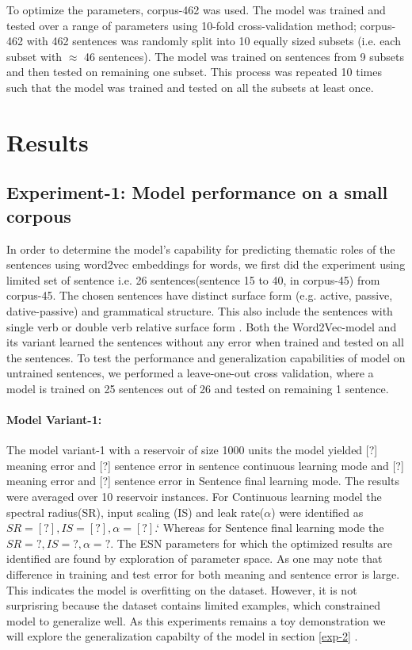 To optimize the parameters, corpus-462 was used. The model was trained and tested over a range of parameters using 10-fold cross-validation method; corpus-462 with 462 sentences was randomly split into 10 equally sized subsets (i.e. each subset with $\approx$ 46 sentences). The model was trained on sentences from 9 subsets and then tested on remaining one subset. This process was repeated 10 times such that the model was trained and tested on all the subsets at least once. 


\section{Results}

\subsection{Experiment-1: Model performance on a small corpous}

In order to determine the model's capability for predicting thematic roles of the sentences using word2vec embeddings for words, we first did the experiment using limited set of sentence i.e. 26 sentences(sentence 15 to 40, in corpus-45) from corpus-45. The chosen sentences have distinct surface form (e.g. active, passive, dative-passive) and grammatical structure. This also include the sentences with single verb or double verb relative surface form \cite{}. Both the Word2Vec-model and its variant learned the sentences without any error when trained and tested on all the sentences. To test the performance and generalization capabilities of model on untrained sentences, we performed a leave-one-out cross validation, where a model is trained on 25 sentences out of 26 and tested on remaining 1 sentence.

\paragraph{Model Variant-1:} The model variant-1 with a reservoir of size 1000 units the model yielded [?] meaning error and [?] sentence error in sentence continuous learning mode and [?] meaning error and [?] sentence error in Sentence final learning mode. The results were averaged over 10 reservoir instances. For Continuous learning model the spectral radius(SR), input scaling (IS) and leak rate($\alpha$) were identified as $SR=[?], IS=[?], \alpha=[?]$.` Whereas for Sentence final learning mode the $SR=?, IS=?, \alpha=?$. The ESN parameters for which the optimized results are identified are found by exploration of parameter space. As one may note that difference in training and test error for both meaning and sentence error is large. This indicates the model is overfitting on the dataset. However, it is not surprisring because the dataset contains limited examples, which constrained model to generalize well. As this experiments remains a toy demonstration we will explore the generalization capabilty of the model in section \ref{exp-2} .

